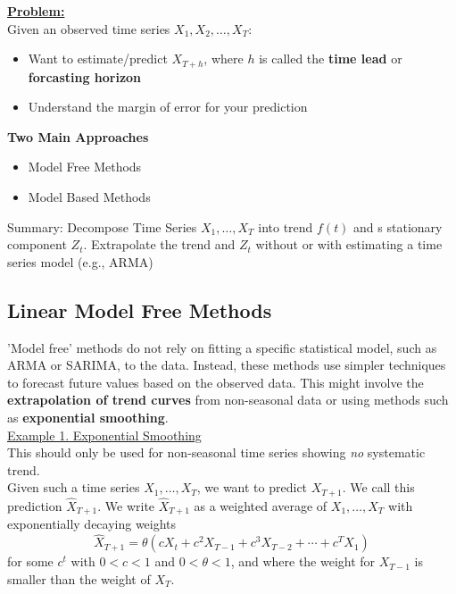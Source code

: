 \textbf{\underline{Problem:}}\\
Given an observed time series $X_1, X_2,\ldots,X_T$:\\
\begin{itemize}
    \item  Want to estimate/predict $X_{T+h}$, where $h$ is called the \textbf{time lead} or \textbf{forcasting horizon}
    \item Understand the margin of error for your prediction 
\end{itemize}

\textbf{Two Main Approaches}
\begin{itemize}
    \item Model Free Methods
    \item Model Based Methods
\end{itemize}


Summary: Decompose Time Series $X_1,\ldots,X_T$ into trend $f(t)$ and s stationary component $Z_t$. Extrapolate the trend and $Z_t$ without or with estimating a time series model (e.g., ARMA)

\subsection{Linear Model Free Methods}

'Model free' methods do not rely on fitting a specific statistical model, such as ARMA or SARIMA, to the data. Instead, these methods use simpler techniques to forecast future values based on the observed data. This might involve the \textbf{extrapolation of trend curves} from non-seasonal data or using methods such as \textbf{exponential smoothing}. \\

\underline{Example 1. Exponential Smoothing}\\

This should only be used for non-seasonal time series showing \textit{no} systematic trend. \\

Given such a time series $X_1,\ldots,X_T$, we want to predict $X_{T+1}$. We call this prediction $\hat{X}_{T+1}$. We write $\hat{X}_{T+1} $ as a weighted average of $X_1,\ldots,X_T$ with exponentially decaying weights \[
    \hat{X}_{T+1} = \theta(cX_t+c^2X_{T-1} + c^3X_{T-2}+\cdots+c^TX_1)
    \] for some $c^t$ with $0<c<1$ and $0<\theta<1$, and where the weight for $X_{T-1}$ is smaller than the weight of $X_T$.\\

